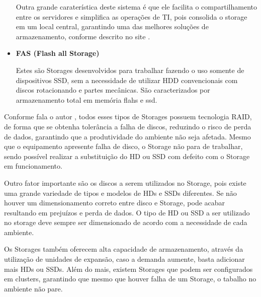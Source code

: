 \begin{itemize}
Outra grande caraterística deste sistema é que ele facilita o compartilhamento entre os servidores e simplifica as operações de TI, pois consolida o storage em um local central, garantindo uma das melhores soluções de armazenamento, conforme descrito no site .

\item \textbf{FAS (Flash all Storage)}

Estes são Storages desenvolvidos para trabalhar fazendo o uso somente de dispositivos SSD, sem a necessidade de utilizar HDD convencionais com discos rotacionando e partes mecânicas. São caracterizados por armazenamento total em memória flahs e ssd.

\end{itemize}

Conforme fala o autor , todos esses tipos de Storages possuem tecnologia RAID, de forma que se obtenha tolerância a falha de discos, reduzindo o risco de perda de dados, garantindo que a produtividade do ambiente não seja afetada. Mesmo que o equipamento apresente falha de disco, o Storage não para de trabalhar, sendo possível realizar a substituição do HD ou SSD com defeito com o Storage em funcionamento.

Outro fator importante são os discos a serem utilizados no Storage, pois existe uma grande variedade de tipos e modelos de HDs e SSDs diferentes. Se não houver um dimensionamento correto entre disco e Storage, pode acabar resultando em prejuízos e perda de dados. O tipo de HD ou SSD a ser utilizado no storage deve sempre ser dimensionado de acordo com a necessidade de cada ambiente.

Os Storages também oferecem alta capacidade de armazenamento, através da utilização de unidades de expansão, caso a demanda aumente, basta adicionar mais HDs ou SSDs. Além do mais, existem Storages que podem ser configurados em clusters, garantindo que mesmo que houver falha de um Storage, o tabalho no ambiente não pare.


